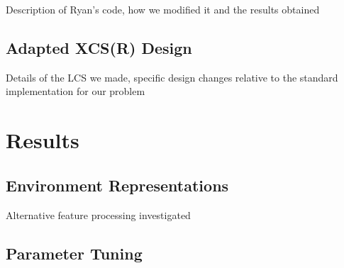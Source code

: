 \documentclass[11pt]{article}
\begin{document}
\begin{multicols}{2}

Description of Ryan's code, how we modified it and the results obtained



\subsection{Adapted XCS(R) Design}
\label{sec:home}

Details of the LCS we made, specific design changes relative to the standard implementation for our problem




%
%
%
%
%




\section{Results}


\subsection{Environment Representations}

Alternative feature processing investigated



\subsection{Parameter Tuning}

%
%
%







\end{multicols}
\end{document}
